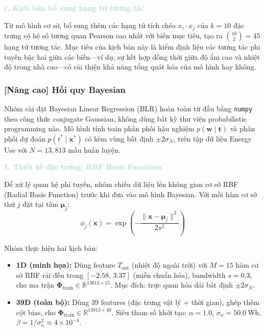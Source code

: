 \noindent\textcolor{lightblue}{\textbf{c. Kịch bản bổ sung hạng tử tương tác}}

Từ mô hình cơ sở, bổ sung thêm các hạng tử tích chéo $x_i \cdot x_j$
của $k=10$ đặc trưng có hệ số tương quan Pearson cao nhất với biến mục tiêu,
tạo ra $\binom{10}{2} = 45$ hạng tử tương tác. Mục tiêu của kịch bản này
là kiểm định liệu các tương tác phi tuyến bậc hai giữa các biến---ví dụ,
sự kết hợp đồng thời giữa độ ẩm cao và nhiệt độ trong nhà cao---có cải
thiện khả năng tổng quát hóa của mô hình hay không.

\subsubsection{[Nâng cao] Hồi quy Bayesian}

Nhóm cài đặt Bayesian Linear Regression (BLR) hoàn toàn từ đầu bằng
\texttt{numpy} theo công thức conjugate Gaussian, không dùng bất kỳ
thư viện probabilistic programming nào. Mô hình tính toán phân phối
hậu nghiệm $p(\mathbf{w} \mid \mathbf{t})$ và phân phối dự đoán
$p(t^* \mid \mathbf{x}^*)$ có kèm vùng bất định $\pm 2\sigma_N$,
trên tập dữ liệu Energy Use với $N = 13{,}813$ mẫu huấn luyện.

\vspace{0.5em}
\noindent\textcolor{lightblue}{\textbf{1. Thiết kế đặc trưng: RBF Basis Functions}}
\vspace{0.5em}

Để xử lý quan hệ phi tuyến, nhóm chiếu dữ liệu lên không gian cơ sở
RBF (Radial Basis Function) trước khi đưa vào mô hình Bayesian.
Với mỗi hàm cơ sở thứ $j$ đặt tại tâm $\boldsymbol{\mu}_j$:
\begin{equation}
    \phi_j(\mathbf{x}) = \exp\!\left(-\frac{\|\mathbf{x} - \boldsymbol{\mu}_j\|^2}{2s^2}\right)
\end{equation}

Nhóm thực hiện hai kịch bản:

\begin{itemize}[labelsep=10pt, leftmargin=2cm]
    \item \textbf{1D (minh họa):} Dùng feature $T_{\text{out}}$ (nhiệt độ
          ngoài trời) với $M = 15$ hàm cơ sở RBF rải đều trong
          $[-2.58,\, 3.37]$ (miền chuẩn hóa), bandwidth $s = 0.3$,
          cho ma trận $\boldsymbol{\Phi}_{\text{train}} \in \mathbb{R}^{13813 \times 15}$.
          Mục đích: trực quan hóa dải bất định $\pm 2\sigma_N$.
    \item \textbf{39D (toàn bộ):} Dùng 39 features (đặc trưng vật lý + thời gian),
          ghép thêm cột bias, cho $\boldsymbol{\Phi}_{\text{train}} \in \mathbb{R}^{13813 \times 40}$.
          Siêu tham số khởi tạo: $\alpha = 1.0$,
          $\sigma_n = 50.0\ \text{Wh}$, $\beta = 1/\sigma_n^2 \approx 4 \times 10^{-4}$.
\end{itemize}

